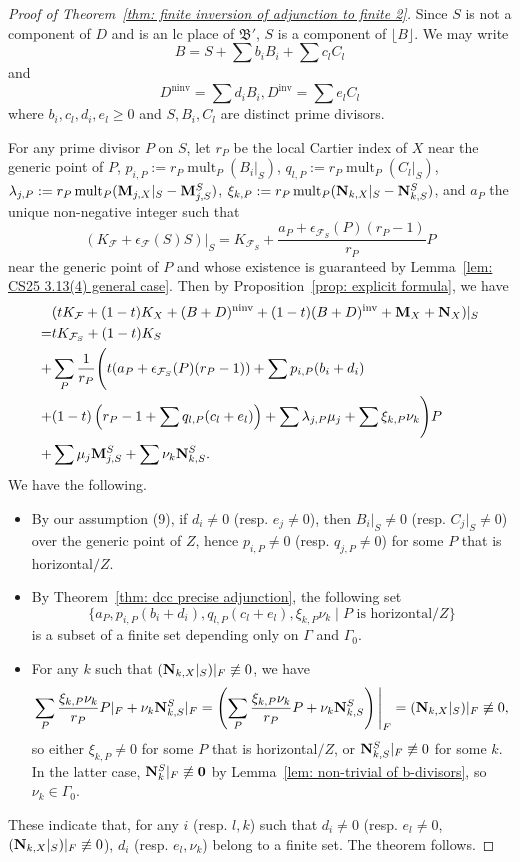 \documentclass[11pt,reqno]{amsart}
\numberwithin{equation}{section}
\newcommand{\Mm}{{\bf{M}}}
\newcommand{\Nn}{{\bf{N}}}
\newcommand{\ninv}{\operatorname{ninv}}
\newcommand{\inv}{\operatorname{inv}}
\newcommand{\mult}{\operatorname{mult}}
\newcommand{\Bb}{{\mathfrak{B}}}
\newcommand{\Ff}{\mathcal{F}}
\newcommand{\Ii}{\Gamma}
\theoremstyle{definition}
\begin{document}
\begin{proof}[Proof of Theorem~\ref{thm: finite inversion of adjunction to finite 2}]
Since $S$ is not a component of $D$ and is an lc place of $\Bb'$,
$S$ is a component of $\lfloor B\rfloor$.
We may write $$B=S+\sum b_{i}B_{i}+\sum c_{l}C_{l}$$
and
$$D^{\ninv}=\sum d_{i}B_{i},D^{\inv}=\sum e_{l}C_{l}$$
where $b_{i},c_{l},d_{i},e_{l}\geq 0$ and $S,B_{i},C_{l}$ are distinct prime divisors.

For any prime divisor $P$ on $S$, let $r_{P}$ be the local Cartier index of $X$ near the generic point of $P$,
$p_{i,P}:=r_{P}\mult_{P}(B_{i}|_{S})$, $q_{l,P}:=r_{P}\mult_{P}(C_{l}|_{S})$, $\lambda_{j,P}:=r_{P}\mult_{P}(\Mm_{j,X}|_{S}-\Mm_{j,S}^S)$, $\xi_{k,P}:=r_{P}\mult_{P}(\Nn_{k,X}|_{S}-\Nn_{k,S}^S)$, and $a_{P}$ the unique non-negative integer such that
$$(K_{\Ff}+\epsilon_{\Ff}(S)S)|_{S}=K_{\Ff_{S}}+\frac{a_{P}+\epsilon_{\Ff_{S}}(P)(r_{P}-1)}{r_{P}}P$$
near the generic point of $P$ and whose existence is guaranteed by Lemma~\ref{lem: CS25 3.13(4) general case}. Then by Proposition~\ref{prop: explicit formula}, we have
\begin{align*}
    &(tK_{\Ff}+(1-t)K_{X}+(B+D)^{\ninv}+(1-t)(B+D)^{\inv}+\Mm_{X}+\Nn_{X})|_{S}\\
    =&tK_{\Ff_{S}}+(1-t)K_{S}\\
    +&\sum_{P}\frac{1}{r_{P}}\Bigg(t(a_{P}+\epsilon_{\Ff_{S}}(P)(r_{P}-1))+\sum p_{i,P}(b_{i}+d_{i})\\
    +&(1-t)\left(r_{P}-1+\sum q_{l,P}(c_{l}+e_{l})\right)+\sum \lambda_{j,P}\mu_{j}+\sum\xi_{k,P}\nu_k\Bigg)P\\
    +&\sum \mu_{j}\Mm^S_{j,S}+\sum \nu_{k}\Nn^S_{k,S}.
\end{align*}
We have the following.
\begin{itemize}
\item By our assumption (9), if $d_i\neq0$ (resp. $e_j\neq0$), then $B_i|_S\neq0$ (resp. $C_j|_S\neq0$) over the generic point of $Z$, hence $p_{i,P}\neq0$ (resp. $q_{j,P}\neq0$) for some $P$ that is horizontal$/Z$.
\item By Theorem~\ref{thm: dcc precise adjunction}, the following set
$$\{a_P,p_{i,P}(b_i+d_i),q_{l,P}(c_l+e_l),\xi_{k,P}\nu_k\mid P\text{ is horizontal}/Z\}$$
is a subset of a finite set depending only on $\Ii$ and $\Ii_0$.
\item For any $k$ such that $(\Nn_{k,X}|_S)|_F\not\equiv 0$, we have
$$\sum_P \frac{\xi_{k,P}\nu_k}{r_P}P|_F+\nu_k\Nn_{k,S}^S|_F=\left(\sum_P \frac{\xi_{k,P}\nu_k}{r_P}P+\nu_k\Nn_{k,S}^S\right)\Bigg|_F=(\Nn_{k,X}|_S)|_F\not\equiv0,$$
so either $\xi_{k,P}\neq0$ for some $P$ that is horizontal$/Z$, or $\Nn_{k,S}^S|_F\not\equiv0$ for some $k$. In the latter case, $\Nn_{k}^S|_F\not\equiv\bm{0}$ by Lemma~\ref{lem: non-trivial of b-divisors}, so $\nu_k\in\Ii_0$.
\end{itemize}
These indicate that, for any $i$ (resp. $l,k$) such that $d_i\neq0$ (resp. $e_l\neq0$, $(\Nn_{k,X}|_S)|_F\not\equiv0$), $d_i$ (resp. $e_l,\nu_k$) belong to a finite set. The theorem follows.
\end{proof}
\end{document}
